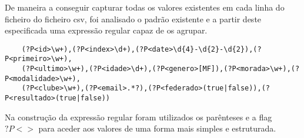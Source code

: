 De maneira a conseguir capturar todas os valores existentes em cada linha do ficheiro
do ficheiro csv, foi analisado o padrão existente e a partir deste especificada uma expressão regular 
capaz de os agrupar.

\begin{verbatim}
    (?P<id>\w+),(?P<index>\d+),(?P<date>\d{4}-\d{2}-\d{2}),(?P<primeiro>\w+),
    (?P<ultimo>\w+),(?P<idade>\d+),(?P<genero>[MF]),(?P<morada>\w+),(?P<modalidade>\w+),
    (?P<clube>\w+),(?P<email>.*?),(?P<federado>(true|false)),(?P<resultado>(true|false))
\end{verbatim}

Na construção da expressão regular foram utilizados os parênteses e a flag $?P<>$
para aceder aos valores de uma forma mais simples e estruturada.